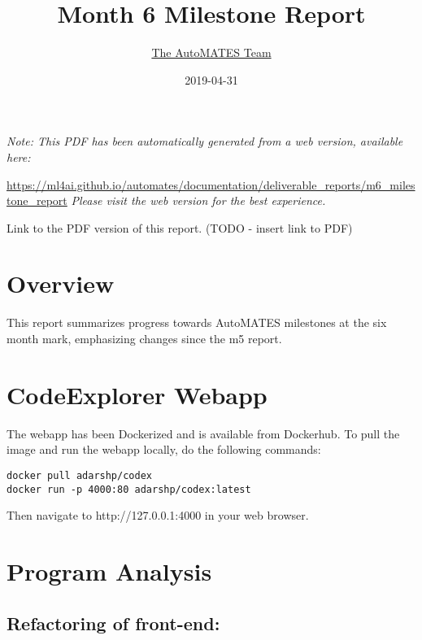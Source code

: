 \documentclass[article, 12pt, oneside]{memoir}
\title{Month 6 Milestone Report}
\author{\href{https://ml4ai.github.io/automates/team/}{The AutoMATES Team}}
\date{2019-04-31}
\begin{document}
\maketitle
\tableofcontents*

\bigskip
\bigskip

\noindent \emph{Note: This PDF has been automatically generated from a web
  version, available here:}

  {
  \small
\noindent
\url{https://ml4ai.github.io/automates/documentation/deliverable_reports/m6_milestone_report}
}
\emph{Please visit the web version for the best experience.}

Link to the PDF version of this report. (TODO - insert link to PDF)

\hypertarget{overview}{%
\section{Overview}\label{overview}}

This report summarizes progress towards AutoMATES milestones at the six
month mark, emphasizing changes since the m5 report.

\hypertarget{codeexplorer-webapp}{%
\section{CodeExplorer Webapp}\label{codeexplorer-webapp}}

The webapp has been Dockerized and is available from Dockerhub. To pull
the image and run the webapp locally, do the following commands:

\begin{verbatim}
docker pull adarshp/codex
docker run -p 4000:80 adarshp/codex:latest
\end{verbatim}

Then navigate to http://127.0.0.1:4000 in your web browser.

\hypertarget{program-analysis}{%
\section{Program Analysis}\label{program-analysis}}

\hypertarget{refactoring-of-front-end}{%
\subsection{Refactoring of front-end:}\label{refactoring-of-front-end}}
\end{document}
